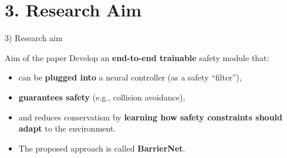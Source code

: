 \documentclass[10pt,aspectratio=169]{beamer}
\begin{document}
\section{3. Research Aim}

\begin{frame}{3) Research aim}
\begin{block}{Aim of the paper}
Develop an \textbf{end-to-end trainable} safety module that:
\begin{itemize}
  \item can be \textbf{plugged into} a neural controller (as a safety ``filter''),
  \item \textbf{guarantees safety} (e.g., collision avoidance),
  \item and reduces conservatism by \textbf{learning how safety constraints should adapt} to the environment.
\end{itemize}
\end{block}

\begin{itemize}
  \item The proposed approach is called \textbf{BarrierNet}.
\end{itemize}
\end{frame}

\end{document}
